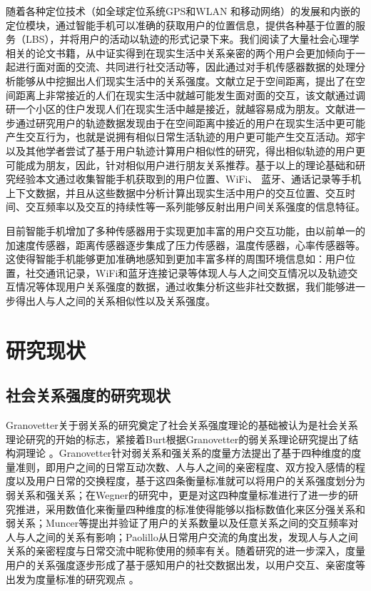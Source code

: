 \par 随着各种定位技术（如全球定位系统GPS和WLAN 和移动网络）的发展和内嵌的定位模块，通过智能手机可以准确的获取用户的位置信息，提供各种基于位置的服务（LBS），并将用户的活动以轨迹的形式记录下来。我们阅读了大量社会心理学相关的论文书籍，从中证实得到在现实生活中关系亲密的两个用户会更加倾向于一起进行面对面的交流、共同进行社交活动等，因此通过对手机传感器数据的处理分析能够从中挖掘出人们现实生活中的关系强度。文献\cite{zillmann2013selective}立足于空间距离，提出了在空间距离上非常接近的人们在现实生活中就越可能发生面对面的交互，该文献通过调研一个小区的住户发现人们在现实生活中越是接近，就越容易成为朋友。文献\cite{zajonc1968attitudinal,zillmann2000mood}进一步通过研究用户的轨迹数据发现由于在空间距离中接近的用户在现实生活中更可能产生交互行为，也就是说拥有相似日常生活轨迹的用户更可能产生交互活动。郑宇 以及其他学者尝试了基于用户轨迹计算用户相似性的研究，得出相似轨迹的用户更可能成为朋友，因此，针对相似用户进行朋友关系推荐。基于以上的理论基础和研究经验本文通过收集智能手机获取到的用户位置、WiFi、 蓝牙、通话记录等手机上下文数据，并且从这些数据中分析计算出现实生活中用户的交互位置、交互时间、交互频率以及交互的持续性等一系列能够反射出用户间关系强度的信息特征。

\par 目前智能手机增加了多种传感器用于实现更加丰富的用户交互功能，由以前单一的加速度传感器，距离传感器逐步集成了压力传感器，温度传感器，心率传感器等。这使得智能手机能够更加准确地感知到更加丰富多样的周围环境信息如：用户位置，社交通讯记录，WiFi和蓝牙连接记录等体现人与人之间交互情况以及轨迹交互情况等体现用户关系强度的数据，通过收集分析这些非社交数据，我们能够进一步得出人与人之间的关系相似性以及关系强度。


\section{研究现状}
\subsection{社会关系强度的研究现状}
Granovetter关于弱关系的研究奠定了社会关系强度理论的基础被认为是社会关系理论研究的开始的标志，紧接着Burt根据Granovetter的弱关系理论研究提出了结构洞理论
。Granovetter针对弱关系和强关系的度量方法提出了基于四种维度的度量准则，即用户之间的日常互动次数、人与人之间的亲密程度、双方投入感情的程度以及用户日常的交换程度，基于这四条衡量标准就可以将用户的关系强度划分为弱关系和强关系；在Wegner的研究中，更是对这四种度量标准进行了进一步的研究推进，采用数值化来衡量四种维度的标准使得能够以指标数值化来区分强关系和弱关系；Muncer等提出并验证了用户的关系数量以及任意关系之间的交互频率对人与人之间的关系有影响；Paolillo从日常用户交流的角度出发，发现人与人之间关系的亲密程度与日常交流中昵称使用的频率有关。随着研究的进一步深入，度量用户的关系强度逐步形成了基于感知用户的社交数据出发，以用户交互、亲密度等出发为度量标准的研究观点
。
